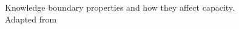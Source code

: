 \begin{figure}
    \centering

    

    \caption{Knowledge boundary properties and how they affect capacity. Adapted from \cite{abraham2015crossing}}
    \label{fig:knowledge-boundary-properties}
\end{figure}
